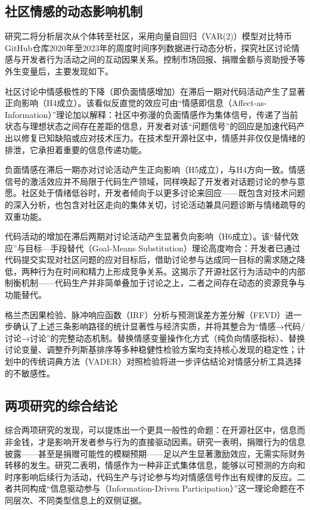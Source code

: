 \documentclass[
    type = master, %
    degree = professional,        %
    decl-page,  %
    twoside,                %
    fontset = fandol %
  ]{njuthesis}
\begin{document}
\subsection{社区情感的动态影响机制}

研究二将分析层次从个体转至社区，采用向量自回归（VAR(2)）模型对比特币GitHub仓库2020年至2023年的周度时间序列数据进行动态分析，探究社区讨论情感与开发者行为活动之间的互动因果关系。控制市场回报、捐赠金额与资助授予等外生变量后，主要发现如下。

社区讨论中情感极性的下降（即负面情感增加）在滞后一期对代码活动产生了显著正向影响（H4成立）。该看似反直觉的效应可由“情感即信息（Affect-as-Information）”理论加以解释\cite{schwarz1983moods}：社区中弥漫的负面情感作为集体信号，传递了当前状态与理想状态之间存在差距的信息，开发者对该“问题信号”的回应是加速代码产出以修复已知缺陷或应对技术压力。在技术型开源社区中，情感并非仅仅是情绪的排泄，它承担着重要的信息传递功能。

负面情感在滞后一期亦对讨论活动产生正向影响（H5成立），与H4方向一致。情感信号的激活效应并不局限于代码生产领域，同样唤起了开发者对话题讨论的参与意愿。社区处于情绪低谷时，开发者倾向于以更多讨论来回应——既包含对技术问题的深入分析，也包含对社区走向的集体关切，讨论活动兼具问题诊断与情绪疏导的双重功能。

代码活动的增加在滞后两期对讨论活动产生显著负向影响（H6成立）。该“替代效应”与目标—手段替代（Goal-Means Substitution）理论高度吻合\cite{kruglanski2002theory}：开发者已通过代码提交实现对社区问题的应对目标后，借助讨论参与达成同一目标的需求随之降低，两种行为在时间和精力上形成竞争关系。这揭示了开源社区行为活动中的内部制衡机制——代码生产并非简单叠加于讨论之上，二者之间存在动态的资源竞争与功能替代。

格兰杰因果检验、脉冲响应函数（IRF）分析与预测误差方差分解（FEVD）进一步确认了上述三条影响路径的统计显著性与经济实质，并将其整合为“情感→代码/讨论→讨论”的完整动态机制。替换情感变量操作化方式（纯负向情感指标）、替换讨论变量、调整乔列斯基排序等多种稳健性检验方案均支持核心发现的稳定性；计划中的传统词典方法（VADER）对照检验将进一步评估结论对情感分析工具选择的不敏感性。

\subsection{两项研究的综合结论}

综合两项研究的发现，可以提炼出一个更具一般性的命题：在开源社区中，信息而非金钱，才是影响开发者参与行为的直接驱动因素。研究一表明，捐赠行为的信息披露——甚至是捐赠可能性的模糊预期——足以产生显著激励效应，无需实际财务转移的发生。研究二表明，情感作为一种非正式集体信息，能够以可预测的方向和时序影响后续行为活动，代码生产与讨论参与均对情感信号作出有规律的反应。二者共同构成“信息驱动参与（Information-Driven Participation）”这一理论命题在不同层次、不同类型信息上的双侧证据。
\end{document}
